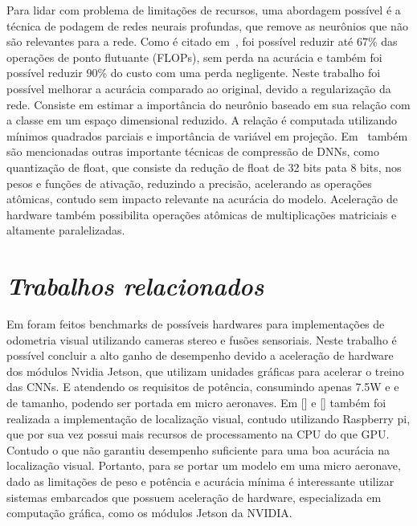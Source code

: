 Para lidar com problema de limitações de recursos, uma abordagem possível é a técnica de podagem de redes neurais profundas, que remove as neurônios que não são relevantes para a rede. Como é citado em~\cite{jordao2019pruning}, foi possível reduzir até 67\% das operações de ponto flutuante (FLOPs), sem perda na acurácia e também foi possível reduzir 90\% do custo com uma perda negligente. Neste trabalho foi possível melhorar a acurácia comparado ao original, devido a regularização da rede. Consiste em estimar a importância do neurônio baseado em sua relação com a classe em um espaço dimensional reduzido. A relação é computada utilizando mínimos quadrados parciais e importância de variável em projeção. Em~\cite{jordao2019pruning} também são mencionadas outras importante técnicas de compressão de DNNs, como quantização de float, que consiste da redução de float de 32 bits pata 8 bits, nos pesos e funções de ativação, reduzindo a precisão, acelerando as operações atômicas, contudo sem impacto relevante na acurácia do modelo. Aceleração de hardware também possibilita operações atômicas de multiplicações matriciais e altamente paralelizadas. 

\section{\textit{Trabalhos relacionados}}\label{sec:Cap2_MR}


Em \cite{jeon2021run} foram feitos benchmarks de possíveis hardwares para implementações de odometria visual utilizando cameras stereo e fusões sensoriais. Neste trabalho é possível concluir a alto ganho de desempenho devido a aceleração de hardware dos módulos Nvidia Jetson, que utilizam unidades gráficas para acelerar o treino das CNNs. E atendendo os requisitos de potência, consumindo apenas 7.5W e e de tamanho, podendo ser portada em micro aeronaves.  Em [] e [] também foi realizada a implementação de localização visual, contudo utilizando Raspberry pi, que por sua vez possui mais recursos de processamento na CPU do que GPU. Contudo  o que não garantiu desempenho suficiente para uma boa acurácia na localização visual. Portanto, para se portar um modelo em uma micro aeronave, dado as limitações de peso e potência e acurácia mínima é interessante utilizar sistemas embarcados que possuem aceleração de hardware, especializada em computação gráfica, como os módulos Jetson da NVIDIA.

